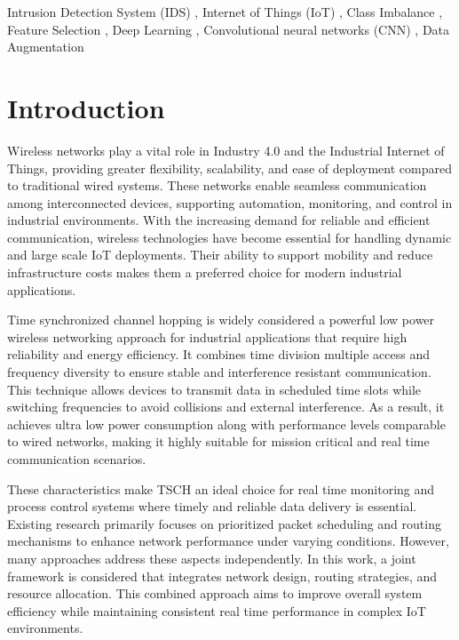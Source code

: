 \documentclass[a4paper,fleqn]{cas-dc}
\numberwithin{equation}{section}
\begin{document}
\begin{keywords}
Intrusion Detection System (IDS) \sep 
Internet of Things (IoT) \sep 
Class Imbalance \sep 
Feature Selection \sep
Deep Learning \sep 
Convolutional neural networks (CNN) \sep
Data Augmentation
\end{keywords}

\maketitle
\section{Introduction}

Wireless networks play a vital role in Industry 4.0 and the Industrial Internet of Things, providing greater flexibility, scalability, and ease of deployment compared to traditional wired systems. These networks enable seamless communication among interconnected devices, supporting automation, monitoring, and control in industrial environments. With the increasing demand for reliable and efficient communication, wireless technologies have become essential for handling dynamic and large scale IoT deployments. Their ability to support mobility and reduce infrastructure costs makes them a preferred choice for modern industrial applications.

Time synchronized channel hopping is widely considered a powerful low power wireless networking approach for industrial applications that require high reliability and energy efficiency. It combines time division multiple access and frequency diversity to ensure stable and interference resistant communication. This technique allows devices to transmit data in scheduled time slots while switching frequencies to avoid collisions and external interference. As a result, it achieves ultra low power consumption along with performance levels comparable to wired networks, making it highly suitable for mission critical and real time communication scenarios.

These characteristics make TSCH an ideal choice for real time monitoring and process control systems where timely and reliable data delivery is essential. Existing research primarily focuses on prioritized packet scheduling and routing mechanisms to enhance network performance under varying conditions. However, many approaches address these aspects independently. In this work, a joint framework is considered that integrates network design, routing strategies, and resource allocation. This combined approach aims to improve overall system efficiency while maintaining consistent real time performance in complex IoT environments.
\end{document}
